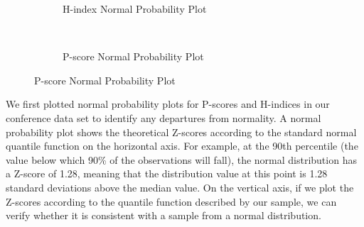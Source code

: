 \documentclass[notitlepage]{svjour3}
\begin{document}
\begin{figure}[ht]
\centering
  \begin{subfigure}{.475\linewidth}
  \centering
 
    \caption{H-index Normal Probability Plot}
    \label{fig:hindex_normality}
  \end{subfigure}
  ~
  \begin{subfigure}{.475\linewidth}
    \caption{P-score Normal Probability Plot}
    \label{fig:pscore_normality}
  \end{subfigure}
\end{figure}

We first plotted normal probability plots for P-scores and H-indices in our conference data set 
to identify any departures from normality. A normal probability plot shows the theoretical Z-scores
according to the standard normal quantile function on the horizontal axis. For example, at the 90th
percentile (the value below which 90\% of the observations will fall), the normal distribution has a
Z-score of 1.28, meaning that the distribution value at this point is 1.28 standard deviations above the median value. On the vertical axis, if
we plot the Z-scores according to the quantile function described by our sample, we can verify
whether it is consistent with a sample from a normal distribution.
\end{document}
